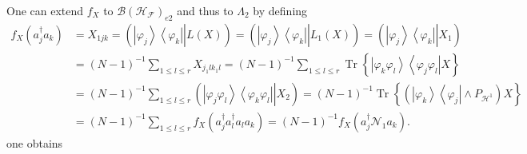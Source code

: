 \documentclass[aps,preprint]{revtex4}%
\begin{document}
One can extend $f_{X}$ to $\mathcal{B}\left(  \mathcal{H}_{\mathcal{F}%
}\right)  _{e2}$ and thus to $\Lambda_{2}$ by defining
\begin{align}
f_{X}\left(  a_{j}^{\dagger}a_{k}\right)   &  =X_{1jk}=\left(  \left.
\left\vert \varphi_{j}\right\rangle \left\langle \varphi_{k}\right\vert
\right\vert L\left(  X\right)  \right)  =\left(  \left.  \left\vert
\varphi_{j}\right\rangle \left\langle \varphi_{k}\right\vert \right\vert
L_{1}\left(  X\right)  \right)  =\left(  \left.  \left\vert \varphi
_{j}\right\rangle \left\langle \varphi_{k}\right\vert \right\vert X_{1}\right)
\nonumber\\
&  =\left(  N-1\right)  ^{-1}\sum_{1\leq l\leq r}X_{j_{1}lk_{1}l}=\left(
N-1\right)  ^{-1}\sum_{1\leq l\leq r}\operatorname*{Tr}\left\{  \left\vert
\varphi_{k}\varphi_{l}\right\rangle \left\langle \varphi_{j}\varphi
_{l}\right\vert X\right\} \nonumber\\
&  =\left(  N-1\right)  ^{-1}\sum_{1\leq l\leq r}\left(  \left.  \left\vert
\varphi_{j}\varphi_{l}\right\rangle \left\langle \varphi_{k}\varphi
_{l}\right\vert \right\vert X_{2}\right)  =\left(  N-1\right)  ^{-1}%
\operatorname*{Tr}\left\{  \left(  \left\vert \varphi_{k}\right\rangle
\left\langle \varphi_{j}\right\vert \wedge P_{\mathcal{H}^{1}}\right)
X\right\} \nonumber\\
&  =\left(  N-1\right)  ^{-1}\sum_{1\leq l\leq r}f_{X}\left(  a_{j}^{\dagger
}a_{l}^{\dagger}a_{l}a_{k}\right)  =\left(  N-1\right)  ^{-1}f_{X}\left(
a_{j}^{\dagger}\mathcal{N}_{1}a_{k}\right)  .
\end{align}
one obtains
\end{document}
